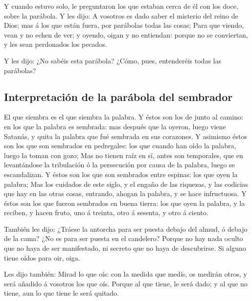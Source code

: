  Y cuando estuvo solo, le preguntaron los que estaban
cerca de él con los doce, sobre la parábola.  Y les dijo:
A vosotros es dado saber el misterio del reino de Dios; mas á los que
están fuera, por parábolas todas las cosas;  Para que
viendo, vean y no echen de ver; y oyendo, oigan y no entiendan: porque
no se conviertan, y les sean perdonados los pecados.

 Y les dijo: ¿No sabéis esta parábola? ¿Cómo, pues,
entenderéis todas las parábolas?

\hypertarget{interpretaciuxf3n-de-la-paruxe1bola-del-sembrador}{%
\subsection{Interpretación de la parábola del
sembrador}\label{interpretaciuxf3n-de-la-paruxe1bola-del-sembrador}}

 El que siembra es el que siembra la palabra.
 Y éstos son los de junto al camino: en los que la
palabra es sembrada: mas después que la oyeron, luego viene Satanás, y
quita la palabra que fué sembrada en sus corazones.  Y
asimismo éstos son los que son sembrados en pedregales: los que cuando
han oído la palabra, luego la toman con gozo;  Mas no
tienen raíz en sí, antes son temporales, que en levantándose la
tribulación ó la persecución por causa de la palabra, luego se
escandalizan.  Y éstos son los que son sembrados entre
espinas: los que oyen la palabra;  Mas los cuidados de
este siglo, y el engaño de las riquezas, y las codicias que hay en las
otras cosas, entrando, ahogan la palabra, y se hace infructuosa.
 Y éstos son los que fueron sembrados en buena tierra:
los que oyen la palabra, y la reciben, y hacen fruto, uno á treinta,
otro á sesenta, y otro á ciento.

 También les dijo: ¿Tráese la antorcha para ser puesta
debajo del almud, ó debajo de la cama? ¿No es para ser puesta en el
candelero?  Porque no hay nada oculto que no haya de ser
manifestado, ni secreto que no haya de descubrirse.  Si
alguno tiene oídos para oir, oiga.

 Les dijo también: Mirad lo que oís: con la medida que
medís, os medirán otros, y será añadido á vosotros los que oís.
 Porque al que tiene, le será dado; y al que no tiene,
aun lo que tiene le será quitado.

